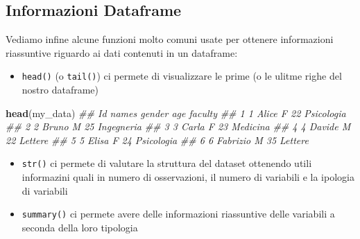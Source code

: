 \documentclass[
]{book}
\newenvironment{Shaded}{\begin{snugshade}}{\end{snugshade}}
\newcommand{\CommentTok}[1]{\textcolor[rgb]{0.56,0.35,0.01}{\textit{#1}}}
\newcommand{\KeywordTok}[1]{\textcolor[rgb]{0.13,0.29,0.53}{\textbf{#1}}}
\newcommand{\NormalTok}[1]{#1}
\providecommand{\tightlist}{%
  \setlength{\itemsep}{0pt}\setlength{\parskip}{0pt}}
\begin{document}
\hypertarget{informazioni-dataframe}{%
\subsection{Informazioni Dataframe}\label{informazioni-dataframe}}

Vediamo infine alcune funzioni molto comuni usate per ottenere informazioni riassuntive riguardo ai dati contenuti in un dataframe:

\begin{itemize}
\tightlist
\item
  \texttt{head()} (o \texttt{tail()}) ci permete di visualizzare le prime (o le ulitme righe del nostro dataframe)
\end{itemize}

\begin{Shaded}
\begin{Highlighting}[]
\KeywordTok{head}\NormalTok{(my_data)}
\CommentTok{##   Id    names gender age    faculty}
\CommentTok{## 1  1    Alice      F  22 Psicologia}
\CommentTok{## 2  2    Bruno      M  25 Ingegneria}
\CommentTok{## 3  3    Carla      F  23   Medicina}
\CommentTok{## 4  4   Davide      M  22    Lettere}
\CommentTok{## 5  5    Elisa      F  24 Psicologia}
\CommentTok{## 6  6 Fabrizio      M  35    Lettere}
\end{Highlighting}
\end{Shaded}

\begin{itemize}
\tightlist
\item
  \texttt{str()} ci permete di valutare la struttura del dataset ottenendo utili informazini quali in numero di osservazioni, il numero di variabili e la ipologia di variabili
\end{itemize}

\begin{Shaded}
\end{Shaded}

\begin{itemize}
\tightlist
\item
  \texttt{summary()} ci permete avere delle informazioni riassuntive delle variabili a seconda della loro tipologia
\end{itemize}
\end{document}
